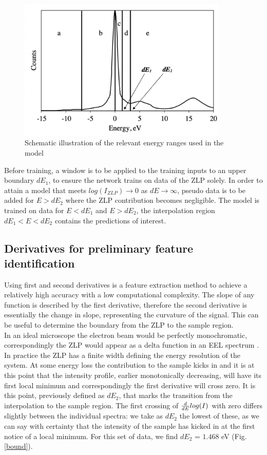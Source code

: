 \documentclass[11pt,a4paper]{article}
\def\frac#1#2{{{#1}\over {#2}}}
\numberwithin{equation}{section}
\numberwithin{figure}{section}
\numberwithin{table}{section}
\begin{document}
\begin{figure}[H]
    \centering
    \includegraphics[width=100mm]{plots/ranges.png}
    \caption{Schematic illustration of the relevant energy ranges used in the model}
    \label{ranges}
\end{figure}

Before training, a window is to be applied to the training inputs to an upper boundary $dE_1$, to ensure the network trains on data of the ZLP solely. In order to attain a model that meets $log(I_{ZLP}) \rightarrow 0$ as $dE \rightarrow \infty$, pseudo data is to be added for $E>dE_2$ where the ZLP contribution becomes negligible. The model is trained on data for $E<dE_1$ and $E>dE_2$, the interpolation region $dE_1 < E < dE_2$ contains the predictions of interest. \\

\subsection{Derivatives for preliminary feature identification}

Using first and second derivatives is a feature extraction method to achieve a relatively high accuracy with a low computational complexity. The slope of any function is described by the first derivative, therefore the second derivative is essentially the change in slope, representing the curvature of the signal. This can be useful to determine the boundary from the ZLP to the sample region. \\

In an ideal microscope the electron beam would be perfectly monochromatic, correspondingly the ZLP would appear as a delta function in an EEL spectrum \cite{rafferty}. In practice the ZLP has a finite width defining the energy resolution of the system. At some energy loss the contribution to the sample kicks in and it is at this point that the intensity profile, earlier monotonically decreasing, will have its first local minimum and correspondingly the first derivative will cross zero. It is this point, previously defined as $dE_2$, that marks the transition from the interpolation to the sample region. The first crossing of $\frac{d}{dE}log(I)$ with zero differs slightly between the individual spectra: we take as $dE_2$ the lowest of these, as we can say with certainty that the intensity of the sample has kicked in at the first notice of a local minimum. For this set of data, we find $dE_2$ = $1.468$ eV (Fig. \ref{bound}). 
\end{document}

